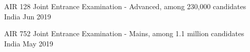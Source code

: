 

\begin{cvhonors}

  \cvhonor
    {AIR 128} %
    {Joint Entrance Examination - Advanced, among 230,000 candidates} %
    {India} %
    {Jun 2019} %

  \cvhonor
    {AIR 752} %
    {Joint Entrance Examination - Mains, among 1.1 million candidates} %
    {India} %
    {May 2019} %


    


\end{cvhonors}